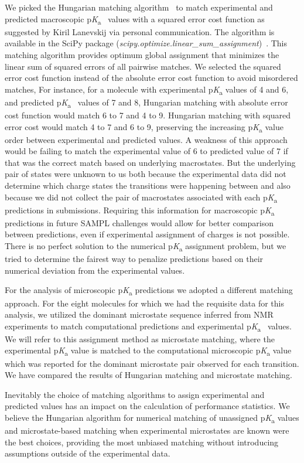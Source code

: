\documentclass[9pt,lineno,final]{elife}
\newcommand{\pKa}{p\textit{K}\textsubscript{a}}
\begin{document}
We picked the Hungarian matching algorithm~\citep{Kuhn:1955:Nav.Res.Logist.Q., Munkres:1957:JSIAM} to match experimental and predicted macroscopic \pKa{}~ values with a squared error cost function as suggested by Kiril Lanevskij via personal communication. 
The algorithm is available in the SciPy package (\textit{scipy.optimize.linear\_sum\_assignment})~\citep{SciPy-linear-sum-assignment}.
This matching algorithm provides optimum global assignment that minimizes the linear sum of squared errors of all pairwise matches.
We selected the squared error cost function instead of the absolute error cost function to avoid misordered matches,
For instance, for a molecule with experimental \pKa{} values of 4 and 6, and predicted \pKa{}~ values of 7 and 8, Hungarian matching with absolute error cost function would match 6 to 7 and 4 to 9.
Hungarian matching with squared error cost would match 4 to 7 and 6 to 9, preserving the increasing \pKa{} value order between experimental and predicted values.
A weakness of this approach would be failing to match the experimental value of 6 to predicted value of 7 if that was the correct match based on underlying macrostates. 
But the underlying pair of states were unknown to us both because the experimental data did not determine which charge states the transitions were happening between and also because we did not collect the pair of macrostates associated with each \pKa{} predictions in submissions. 
Requiring this information for macroscopic \pKa{} predictions in future SAMPL challenges would allow for better comparison between predictions, even if experimental assignment of charges is not possible.
There is no perfect solution to the numerical \pKa{} assignment problem, but we tried to determine the fairest way to penalize predictions based on their numerical deviation from the experimental values.

For the analysis of microscopic \pKa{} predictions we adopted a different matching approach. 
For the eight molecules for which we had the requisite data for this analysis, we utilized the dominant microstate sequence inferred from NMR experiments to match computational predictions and experimental \pKa{}~ values. 
We will refer to this assignment method as microstate matching, where the experimental \pKa{} value is matched to the computational microscopic \pKa{} value which was reported for the dominant microstate pair observed for each transition. 
We have compared the results of Hungarian matching and microstate matching. 

Inevitably the choice of matching algorithms to assign experimental and predicted values has an impact on the calculation of performance statistics. 
We believe the Hungarian algorithm for numerical matching of unassigned \pKa{} values and microstate-based matching when experimental microstates are known were the best choices, providing the most unbiased matching without introducing assumptions outside of the experimental data.
\end{document}
